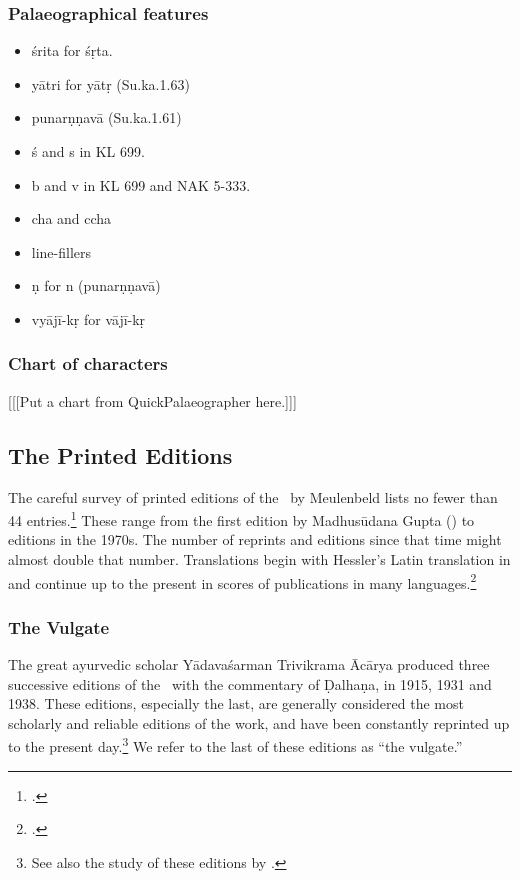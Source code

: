 \subsubsection{Palaeographical features}
\begin{itemize}
    \item śrita for śṛta.
    \item yātri for yātṛ (Su.ka.1.63) %
     \item punarṇṇavā  (Su.ka.1.61) %
    \item ś and s in KL 699.
    \item b and v in KL 699 and NAK 5-333.
    \item cha and ccha
    \item line-fillers
    \item \d n for n (punar\d n\d nav\=a)
    \item vyājī-kṛ for vājī-kṛ
\end{itemize}

\subsubsection{Chart of characters}

[[[Put a chart from QuickPalaeographer here.]]]

\subsection{The Printed Editions}

The careful survey of printed editions of the \SS\ by Meulenbeld lists no fewer than 
44 entries.\footcite[IIB, 311--314]{meul-hist}  These range from the first edition 
by 
Madhusūdana Gupta (\citeyear{gupt-1835}) to editions in the 1970s. The 
number of 
reprints and editions since that time might almost double that number.  
Translations begin with Hessler's Latin translation in \citeyear{hess-1855} and 
continue up to the present in scores of publications in many 
languages.\footcites[E.g.,]{zysk-1984}[IIB, 314--315]{meul-hist}

\subsubsection{The Vulgate}


The great ayurvedic scholar Yādavaśarman Trivikrama Ācārya produced three 
successive editions of the
\SS\ with the commentary of Ḍalhaṇa, in 1915, 1931 and 1938.  These
editions, especially the last, are generally considered the most 
scholarly
and reliable editions of the work, and have been constantly reprinted up
to the present day.\footnote{See also the study of these editions by \textcites[\S 
1.2]{kleb-2021b}[143--144]{wuja-2013}.}  We refer to the last of these editions 
as “the vulgate.”

